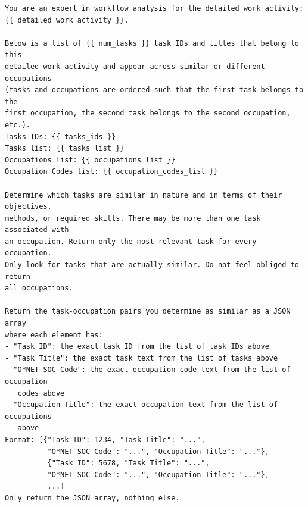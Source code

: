 \newpage
\begin{tcolorbox}[colback=gray!5, colframe=black!60, title={Prompt \#2: GPT-5-mini Prompt for Finding Similar Tasks in Each DWA}]
\footnotesize
\begin{verbatim}
You are an expert in workflow analysis for the detailed work activity: 
{{ detailed_work_activity }}.

Below is a list of {{ num_tasks }} task IDs and titles that belong to this 
detailed work activity and appear across similar or different occupations 
(tasks and occupations are ordered such that the first task belongs to the 
first occupation, the second task belongs to the second occupation, etc.).
Tasks IDs: {{ tasks_ids }}
Tasks list: {{ tasks_list }}
Occupations list: {{ occupations_list }}
Occupation Codes list: {{ occupation_codes_list }}

Determine which tasks are similar in nature and in terms of their objectives, 
methods, or required skills. There may be more than one task associated with 
an occupation. Return only the most relevant task for every occupation. 
Only look for tasks that are actually similar. Do not feel obliged to return 
all occupations.

Return the task-occupation pairs you determine as similar as a JSON array 
where each element has:
- "Task ID": the exact task ID from the list of task IDs above
- "Task Title": the exact task text from the list of tasks above
- "O*NET-SOC Code": the exact occupation code text from the list of occupation
   codes above
- "Occupation Title": the exact occupation text from the list of occupations 
   above
Format: [{"Task ID": 1234, "Task Title": "...", 
          "O*NET-SOC Code": "...", "Occupation Title": "..."}, 
          {"Task ID": 5678, "Task Title": "...", 
          "O*NET-SOC Code": "...", "Occupation Title": "..."}, 
          ...]
Only return the JSON array, nothing else.
\end{verbatim}
\end{tcolorbox}


